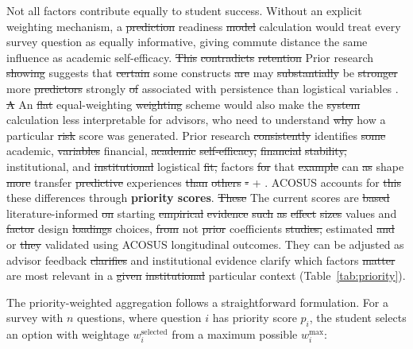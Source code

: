 \documentclass[letterpaper,11pt]{article}
\newcommand{\DIFdel}[1]{%
  \begingroup\setlength{\fboxsep}{0.5pt}%
  \colorbox{diffdelbg}{\textcolor{diffdeltext}{\sout{#1}}}%
  \endgroup}
\newcommand{\DIFadd}[1]{%
  \begingroup\setlength{\fboxsep}{0.5pt}%
  \colorbox{diffaddbg}{\textcolor{diffaddtext}{#1}}%
  \endgroup}
\newcommand{\DIFdelcite}[1]{%
  \DIFdel{-}\textcolor{diffdeltext}{#1}}
\newcommand{\DIFaddcite}[1]{%
  \DIFadd{+}\textcolor{diffaddtext}{#1}}
\begin{document}
Not all factors contribute equally to student success. Without an explicit weighting mechanism, a \DIFdel{prediction} \DIFadd{readiness} \DIFdel{model} \DIFadd{calculation} would treat every survey question as equally informative, giving commute distance the same influence as academic self-efficacy. \DIFdel{This} \DIFdel{contradicts} \DIFdel{retention} \DIFadd{Prior} research \DIFdel{showing} \DIFadd{suggests} that \DIFdel{certain} \DIFadd{some} constructs \DIFdel{are} \DIFadd{may} \DIFdel{substantially} \DIFadd{be} \DIFdel{stronger} \DIFadd{more} \DIFdel{predictors} \DIFadd{strongly} \DIFdel{of} \DIFadd{associated} \DIFadd{with} persistence than logistical variables \parencite{factoranalysis2023}. \DIFdel{A} \DIFadd{An} \DIFdel{flat} \DIFadd{equal-weighting} \DIFdel{weighting} \DIFadd{scheme} would also make the \DIFdel{system} \DIFadd{calculation} less interpretable for advisors, who need to understand \DIFdel{why} \DIFadd{how} a particular \DIFdel{risk} score was generated. Prior research \DIFdel{consistently} identifies \DIFdel{some} \DIFadd{academic,} \DIFdel{variables} \DIFadd{financial,} \DIFdel{academic} \DIFdel{self-efficacy,} \DIFdel{financial} \DIFdel{stability,} \DIFadd{institutional,} and \DIFdel{institutional} \DIFadd{logistical} \DIFdel{fit,} \DIFadd{factors} \DIFdel{for} \DIFadd{that} \DIFdel{example} \DIFadd{can} \DIFdel{as} \DIFadd{shape} \DIFdel{more} \DIFadd{transfer} \DIFdel{predictive} \DIFadd{experiences} \DIFdel{than} \DIFdel{others} \DIFdelcite{\parencite{computingtransfer2024}} \DIFaddcite{\parencite{factoranalysis2023,computingtransfer2024}}. ACOSUS accounts for \DIFdel{this} \DIFadd{these} \DIFadd{differences} through \textbf{priority scores}. \DIFdel{These} \DIFadd{The} \DIFadd{current} scores are \DIFdel{based} \DIFadd{literature-informed} \DIFdel{on} \DIFadd{starting} \DIFdel{empirical} \DIFdel{evidence} \DIFdel{such} \DIFdel{as} \DIFdel{effect} \DIFdel{sizes} \DIFadd{values} and \DIFdel{factor} \DIFadd{design} \DIFdel{loadings} \DIFadd{choices,} \DIFdel{from} \DIFadd{not} \DIFdel{prior} \DIFadd{coefficients} \DIFdel{studies,} \DIFadd{estimated} \DIFdel{and} \DIFadd{or} \DIFdel{they} \DIFadd{validated} \DIFadd{using} \DIFadd{ACOSUS} \DIFadd{longitudinal} \DIFadd{outcomes.} \DIFadd{They} can be adjusted as advisor feedback \DIFdel{clarifies} \DIFadd{and} \DIFadd{institutional} \DIFadd{evidence} \DIFadd{clarify} which factors \DIFdel{matter} \DIFadd{are} most \DIFadd{relevant} in a \DIFdel{given} \DIFdel{institutional} \DIFadd{particular} context (Table~\ref{tab:priority}).

The priority-weighted aggregation follows a straightforward formulation. For a survey with $n$ questions, where question $i$ has priority score $p_i$, the student selects an option with weightage $w_i^{\text{selected}}$ from a maximum possible $w_i^{\text{max}}$:
\end{document}
